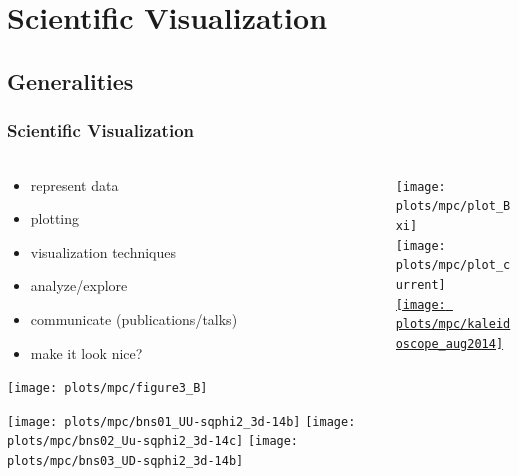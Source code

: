 

\section{Scientific Visualization}
\subsection{Generalities}
\begin{frame}
    \frametitle{Scientific Visualization}
    \framesubtitle{}

    \vspace{-2.5mm}
    \begin{columns} %
    \begin{column}{5.325cm}
        \begin{itemize}
                \item represent data
                \item plotting
                \item visualization techniques
                \item analyze/explore
                \item communicate (publications/talks)
                \item make it look nice?
        \end{itemize}

        \centering
        \texttt{[image: plots/mpc/figure3\_B]}

        \texttt{[image: plots/mpc/bns01\_UU-sqphi2\_3d-14b]}
        \texttt{[image: plots/mpc/bns02\_Uu-sqphi2\_3d-14c]}
        \texttt{[image: plots/mpc/bns03\_UD-sqphi2\_3d-14b]}
    \end{column}
    \begin{column}{7.5cm}
        \texttt{[image: plots/mpc/plot\_Bxi]}
        \\
        \texttt{[image: plots/mpc/plot\_current]}
        \\
        \href{http://journals.aps.org/prd/kaleidoscope/August2014}{\texttt{[image: plots/mpc/kaleidoscope\_aug2014]}}
    \end{column}
    \end{columns}
\end{frame}


